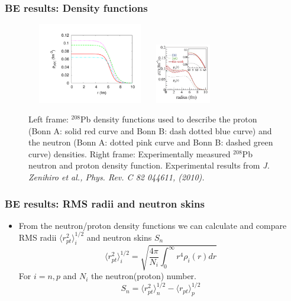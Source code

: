 \documentclass[10pt,serif]{beamer}
\newcommand{\rb}[1]{\left(#1\right)}
\begin{document}
\begin{frame}
\frametitle{BE results: Density functions}
\begin{figure}[!h]
\centering
\includegraphics[width=5.5cm,height=3.5cm]{208Pb_rho_Bonn.pdf}
\hspace{1cm}
\includegraphics[width=2.6cm,height=2.6cm]{rho_exp.jpg}
\caption{\scriptsize {Left frame: $^{208}$Pb density functions used to describe the proton (Bonn A: solid red curve and Bonn B: dash dotted blue curve) and the neutron (Bonn A: dotted pink curve and Bonn B: dashed green curve) densities. Right frame: Experimentally measured $^{208}$Pb neutron and proton density function. Experimental results from \emph{J. Zenihiro et al., Phys. Rev. C 82 044611, (2010).} }}
\end{figure}
\end{frame}
\begin{frame}
\frametitle{BE results: RMS radii and neutron skins}
\begin{itemize}
\item From the neutron/proton density functions we can calculate and compare RMS radii $\langle r^2_{pt} \rangle_i^{1/2}$ and neutron skins $S_n$
\begin{equation}
\langle r^2_{pt} \rangle_i^{1/2} = \sqrt{\frac{4 \pi}{N_i} \int_0^\infty r^4 \rho_i \rb{r} dr }
\end{equation}
For $i=n,p$ and $N_i$ the neutron(proton) number.
\begin{equation}
S_n = \langle r^2_{pt} \rangle_n^{1/2}-\langle r_{pt} \rangle_p^{1/2}
\end{equation}
\end{itemize}
\end{frame}
\end{document}
